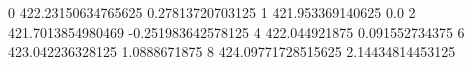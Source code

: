 0 422.23150634765625 0.27813720703125
1 421.953369140625 0.0
2 421.7013854980469 -0.251983642578125
4 422.044921875 0.091552734375
6 423.042236328125 1.0888671875
8 424.09771728515625 2.14434814453125
